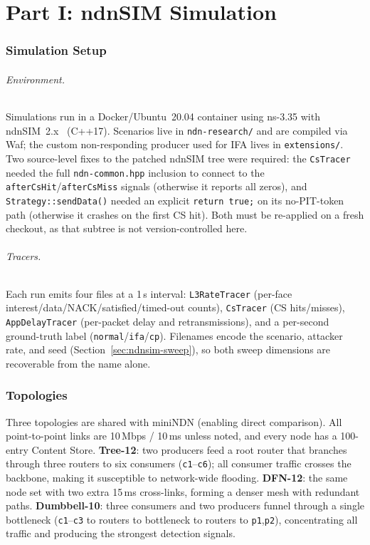 \documentclass[11pt,a4paper]{article}
\begin{document}
\part*{Part I: ndnSIM Simulation}

\section{Simulation Setup}

\paragraph{Environment.} Simulations run in a Docker/Ubuntu~20.04 container using ns-3.35 with ndnSIM~2.x~\cite{ndnsim-repo} (C++17). Scenarios live in \texttt{ndn-research/} and are compiled via Waf; the custom non-responding producer used for IFA lives in \texttt{extensions/}. Two source-level fixes to the patched ndnSIM tree were required: the \texttt{CsTracer} needed the full \texttt{ndn-common.hpp} inclusion to connect to the \texttt{afterCsHit}/\texttt{afterCsMiss} signals (otherwise it reports all zeros), and \texttt{Strategy::sendData()} needed an explicit \texttt{return true;} on its no-PIT-token path (otherwise it crashes on the first CS hit). Both must be re-applied on a fresh checkout, as that subtree is not version-controlled here.

\paragraph{Tracers.} Each run emits four files at a 1\,s interval: \texttt{L3RateTracer} (per-face interest/data/NACK/satisfied/timed-out counts), \texttt{CsTracer} (CS hits/misses), \texttt{AppDelayTracer} (per-packet delay and retransmissions), and a per-second ground-truth label (\texttt{normal}/\texttt{ifa}/\texttt{cp}). Filenames encode the scenario, attacker rate, and seed (Section~\ref{sec:ndnsim-sweep}), so both sweep dimensions are recoverable from the name alone.

\section{Topologies}

Three topologies are shared with miniNDN (enabling direct comparison). All point-to-point links are 10\,Mbps / 10\,ms unless noted, and every node has a 100-entry Content Store. \textbf{Tree-12}: two producers feed a root router that branches through three routers to six consumers (\texttt{c1}--\texttt{c6}); all consumer traffic crosses the backbone, making it susceptible to network-wide flooding. \textbf{DFN-12}: the same node set with two extra 15\,ms cross-links, forming a denser mesh with redundant paths. \textbf{Dumbbell-10}: three consumers and two producers funnel through a single bottleneck (\texttt{c1}--\texttt{c3} to routers to bottleneck to routers to \texttt{p1},\texttt{p2}), concentrating all traffic and producing the strongest detection signals.
\end{document}
